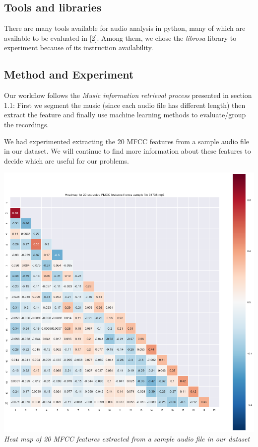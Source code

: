 \documentclass[paper=a4, fontsize=11pt, DIV=13]{scrartcl}
\begin{document}
\subsection{Tools and libraries}

There are many tools available for audio analysis in python, many of which are available to be evaluated in [2]. Among them, we chose the \textit{librosa} library to experiment because of its instruction availability. 


\subsection{Method and Experiment}

Our workflow follows the \textit{Music information retrieval process} presented in section 1.1: First we segment the music (since each audio file has different length) then extract the feature and finally use machine learning methods to evaluate/group the recordings.

We had experimented extracting the 20 MFCC features from a sample audio file in our dataset. We will continue to find more information about these features to decide which are useful for our problems.

\begin{center}
\includegraphics[scale=0.4]{img/2.png}\\
\textit{Heat map of 20 MFCC features extracted from a sample audio file in our dataset}\\
\end{center}
\end{document}
